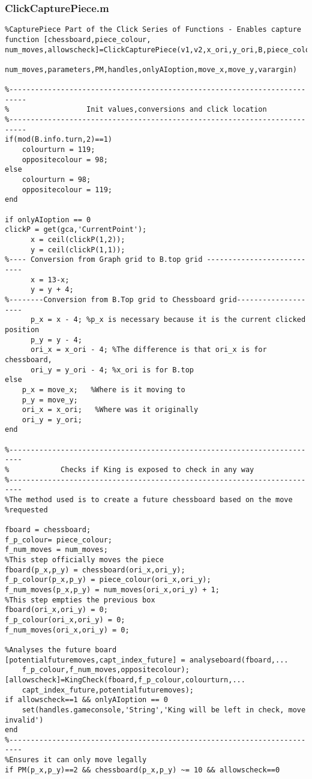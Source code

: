 \documentclass{article}
\begin{document}
\subsubsection{ClickCapturePiece.m}
\begin{lstlisting}
%CapturePiece Part of the Click Series of Functions - Enables capture
function [chessboard,piece_colour, num_moves,allowscheck]=ClickCapturePiece(v1,v2,x_ori,y_ori,B,piece_colour,chessboard,...
    num_moves,parameters,PM,handles,onlyAIoption,move_x,move_y,varargin)

%--------------------------------------------------------------------------
%                  Init values,conversions and click location
%--------------------------------------------------------------------------
if(mod(B.info.turn,2)==1)
    colourturn = 119;
    oppositecolour = 98;
else
    colourturn = 98;
    oppositecolour = 119;
end

if onlyAIoption == 0
clickP = get(gca,'CurrentPoint');
      x = ceil(clickP(1,2));
      y = ceil(clickP(1,1));
%---- Conversion from Graph grid to B.top grid ---------------------------
      x = 13-x;      
      y = y + 4;
%--------Conversion from B.Top grid to Chessboard grid--------------------
      p_x = x - 4; %p_x is necessary because it is the current clicked position
      p_y = y - 4;
      ori_x = x_ori - 4; %The difference is that ori_x is for chessboard,
      ori_y = y_ori - 4; %x_ori is for B.top
else
    p_x = move_x;   %Where is it moving to
    p_y = move_y;
    ori_x = x_ori;   %Where was it originally
    ori_y = y_ori;
end
      
%-------------------------------------------------------------------------
%            Checks if King is exposed to check in any way
%-------------------------------------------------------------------------
%The method used is to create a future chessboard based on the move
%requested

fboard = chessboard;
f_p_colour= piece_colour;
f_num_moves = num_moves;
%This step officially moves the piece
fboard(p_x,p_y) = chessboard(ori_x,ori_y);
f_p_colour(p_x,p_y) = piece_colour(ori_x,ori_y);
f_num_moves(p_x,p_y) = num_moves(ori_x,ori_y) + 1;
%This step empties the previous box
fboard(ori_x,ori_y) = 0;
f_p_colour(ori_x,ori_y) = 0;
f_num_moves(ori_x,ori_y) = 0;

%Analyses the future board
[potentialfuturemoves,capt_index_future] = analyseboard(fboard,...
    f_p_colour,f_num_moves,oppositecolour);
[allowscheck]=KingCheck(fboard,f_p_colour,colourturn,...
    capt_index_future,potentialfuturemoves);
if allowscheck==1 && onlyAIoption == 0
    set(handles.gameconsole,'String','King will be left in check, move invalid')
end
%-------------------------------------------------------------------------
%Ensures it can only move legally
if PM(p_x,p_y)==2 && chessboard(p_x,p_y) ~= 10 && allowscheck==0


\end{lstlisting}
\end{document}
